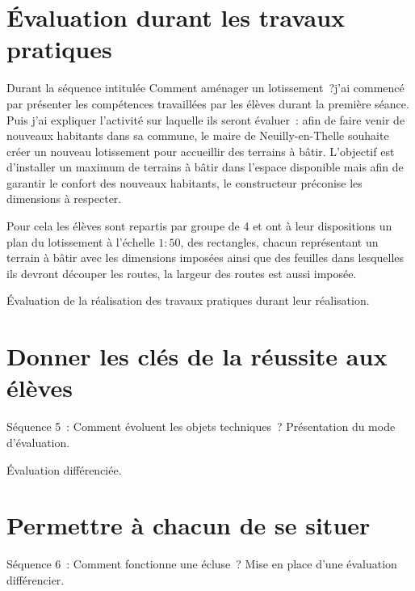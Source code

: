 

\section{Évaluation durant les travaux pratiques}
Durant la séquence intitulée \og Comment aménager un lotissement~?\fg j'ai commencé par présenter les compétences travaillées par les élèves durant la première séance. Puis j'ai expliquer l'activité sur laquelle ils seront évaluer~: afin de faire venir de nouveaux habitants dans sa commune, le maire de Neuilly-en-Thelle souhaite créer un nouveau lotissement pour accueillir des terrains à bâtir.
L'objectif est d'installer un maximum de terrains à bâtir dans l'espace disponible mais afin de garantir le confort des nouveaux habitants, le constructeur préconise les dimensions à respecter.

Pour cela les élèves sont repartis par groupe de 4 et ont à leur dispositions un plan du lotissement à l'échelle $1:50$, des rectangles, chacun représentant un terrain à bâtir avec les dimensions imposées ainsi que des feuilles dans lesquelles ils devront découper les routes, la largeur des routes est aussi imposée.




Évaluation de la réalisation des travaux pratiques durant leur réalisation.


\section{Donner les clés de la réussite aux élèves }
Séquence 5~: Comment évoluent les objets techniques~?
Présentation du mode d'évaluation.

Évaluation différenciée.


\section{Permettre à chacun de se situer }
Séquence 6~: Comment fonctionne une écluse~?
Mise en place d'une évaluation différencier.


